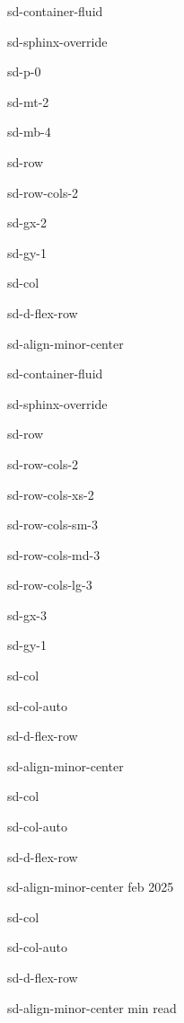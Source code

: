 \documentclass[letterpaper,10pt,italian]{jupyterBook}
\begin{document}
\begin{sphinxuseclass}{sd-container-fluid}
\begin{sphinxuseclass}{sd-sphinx-override}
\begin{sphinxuseclass}{sd-p-0}
\begin{sphinxuseclass}{sd-mt-2}
\begin{sphinxuseclass}{sd-mb-4}
\begin{sphinxuseclass}{sd-row}
\begin{sphinxuseclass}{sd-row-cols-2}
\begin{sphinxuseclass}{sd-gx-2}
\begin{sphinxuseclass}{sd-gy-1}
\begin{sphinxuseclass}{sd-col}
\begin{sphinxuseclass}{sd-d-flex-row}
\begin{sphinxuseclass}{sd-align-minor-center}
\begin{sphinxuseclass}{sd-container-fluid}
\begin{sphinxuseclass}{sd-sphinx-override}
\begin{sphinxuseclass}{sd-row}
\begin{sphinxuseclass}{sd-row-cols-2}
\begin{sphinxuseclass}{sd-row-cols-xs-2}
\begin{sphinxuseclass}{sd-row-cols-sm-3}
\begin{sphinxuseclass}{sd-row-cols-md-3}
\begin{sphinxuseclass}{sd-row-cols-lg-3}
\begin{sphinxuseclass}{sd-gx-3}
\begin{sphinxuseclass}{sd-gy-1}
\begin{sphinxuseclass}{sd-col}
\begin{sphinxuseclass}{sd-col-auto}
\begin{sphinxuseclass}{sd-d-flex-row}
\begin{sphinxuseclass}{sd-align-minor-center}
\end{sphinxuseclass}
\end{sphinxuseclass}
\end{sphinxuseclass}
\end{sphinxuseclass}
\begin{sphinxuseclass}{sd-col}
\begin{sphinxuseclass}{sd-col-auto}
\begin{sphinxuseclass}{sd-d-flex-row}
\begin{sphinxuseclass}{sd-align-minor-center}
 feb 2025

\end{sphinxuseclass}
\end{sphinxuseclass}
\end{sphinxuseclass}
\end{sphinxuseclass}
\begin{sphinxuseclass}{sd-col}
\begin{sphinxuseclass}{sd-col-auto}
\begin{sphinxuseclass}{sd-d-flex-row}
\begin{sphinxuseclass}{sd-align-minor-center}
 min read


\end{sphinxuseclass}
\end{sphinxuseclass}
\end{sphinxuseclass}
\end{sphinxuseclass}
\end{sphinxuseclass}
\end{sphinxuseclass}
\end{sphinxuseclass}
\end{sphinxuseclass}
\end{sphinxuseclass}
\end{sphinxuseclass}
\end{sphinxuseclass}
\end{sphinxuseclass}
\end{sphinxuseclass}
\end{sphinxuseclass}
\end{sphinxuseclass}
\end{sphinxuseclass}
\end{sphinxuseclass}
\end{sphinxuseclass}
\end{sphinxuseclass}
\end{sphinxuseclass}
\end{sphinxuseclass}
\end{sphinxuseclass}
\end{sphinxuseclass}
\end{sphinxuseclass}
\end{sphinxuseclass}
\end{sphinxuseclass}
\end{document}

